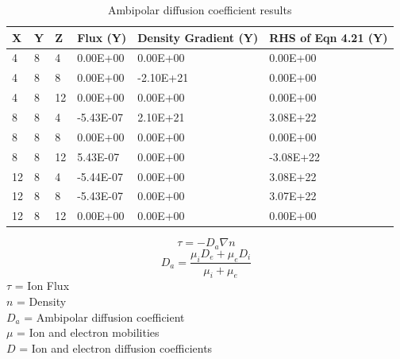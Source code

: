 \begin{table}
\caption{Ambipolar diffusion coefficient results}
\vspace{0.3cm}
\centering
\begin{tabular}{|llllll|}
\hline
X  & Y & Z  & Flux (Y)  & Density Gradient (Y) & RHS of Eqn 4.21 (Y) \\ \hline
4  & 8 & 4  & 0.00E+00  & 0.00E+00  & 0.00E+00  \\
4  & 8 & 8  & 0.00E+00  & -2.10E+21 & 0.00E+00  \\
4  & 8 & 12 & 0.00E+00  & 0.00E+00  & 0.00E+00  \\
8  & 8 & 4  & -5.43E-07 & 2.10E+21  & 3.08E+22  \\
8  & 8 & 8  & 0.00E+00  & 0.00E+00  & 0.00E+00  \\
8  & 8 & 12 & 5.43E-07  & 0.00E+00  & -3.08E+22 \\
12 & 8 & 4  & -5.44E-07 & 0.00E+00  & 3.08E+22  \\
12 & 8 & 8  & -5.43E-07 & 0.00E+00  & 3.07E+22  \\
12 & 8 & 12 & 0.00E+00  & 0.00E+00  & 0.00E+00  \\ \hline
\end{tabular}

\label{tab:adc}

\end{table}


\begin{equation}
    \label{eqn:adc}
    \tau = - D_a \nabla n 
\end{equation}
\begin{equation}
    \label{eqn:adc2}
    D_a = \frac{\mu_i D_e + \mu_e D_i}{\mu_i + \mu_e}
\end{equation}
\(\tau\) = Ion Flux \\
\(n\) = Density \\
\(D_a\) = Ambipolar diffusion coefficient\\
\(\mu\) = Ion and electron mobilities \\
\(D\) = Ion and electron diffusion coefficients \par


